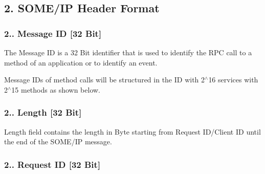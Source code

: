 \subsection*{2. S\+O\+M\+E/\+IP Header Format}

 \subsubsection*{2.. Message ID \mbox{[}32 Bit\mbox{]}}


\begin{DoxyItemize}
\item The Message ID is a 32 Bit identifier that is used to identify the R\+PC call to a method of an application or to identify an event.
\item Message I\+Ds of method calls will be structured in the ID with 2$^\wedge$16 services with 2$^\wedge$15 methods as shown below. 
\end{DoxyItemize}

\subsubsection*{2.. Length \mbox{[}32 Bit\mbox{]}}


\begin{DoxyItemize}
\item Length field contains the length in Byte starting from Request I\+D/\+Client ID until the end of the S\+O\+M\+E/\+IP message.
\end{DoxyItemize}

\subsubsection*{2.. Request ID \mbox{[}32 Bit\mbox{]}}


